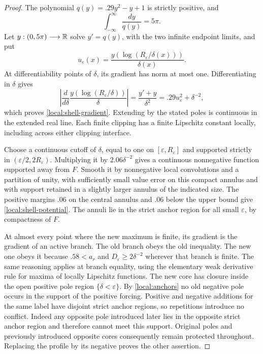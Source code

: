 \begin{proof}
The polynomial
$q(y)=.29y^2-y+1$ is strictly positive, and
\[
 \int_{-\infty}^{\infty}\frac{dy}{q(y)}=5\pi.
\]
Let $y:(0,5\pi)\longrightarrow\mathbb R$ solve $y'=q(y)$, with the two
infinite endpoint limits, and put
\[
 u_\varepsilon(x)=\frac{y(\log(R_\varepsilon/\delta(x)))}{\delta(x)}.
\]
At differentiability points of $\delta$, its gradient has norm at
most one.  Differentiating in $\delta$ gives
\[
 \left|\frac{d}{d\delta}\frac{y(\log(R_\varepsilon/\delta))}{\delta}\right|
   =\frac{y'+y}{\delta^2}
   =.29u_\varepsilon^2+\delta^{-2},
\]
which proves \eqref{local:shell-gradient}.  Extending by the stated
poles is continuous in the extended real line.  Each finite clipping
has a finite Lipschitz constant locally, including across either
clipping interface.

Choose a continuous cutoff of $\delta$, equal to one on
$[\varepsilon,R_\varepsilon]$ and supported strictly in
$(\varepsilon/2,2R_\varepsilon)$.  Multiplying it by
$2.06\delta^{-2}$ gives a continuous nonnegative function supported
away from $F$.  Smooth it by nonnegative local convolutions and a
partition of unity, with sufficiently small value error on this
compact annulus and with support retained in a slightly larger
annulus of the indicated size.  The positive margins $.06$ on the
central annulus and $.06$ below the upper bound give
\eqref{local:shell-potential}.  The annuli lie in the strict anchor
region for all small $\varepsilon$, by compactness of $F$.

At almost every point where the new maximum is finite, its gradient
is the gradient of an active branch.  The old branch obeys the old
inequality.  The new one obeys it because $.58<a_r$ and
$D_\varepsilon\ge2\delta^{-2}$ wherever that branch is finite.
The same reasoning applies at branch equality, using the elementary
weak derivative rule for maxima of locally Lipschitz functions.
The new core has closure inside the open positive pole region
$\{\delta<\varepsilon\}$.  By \cref{local:anchors} no old negative
pole occurs in the support of the positive forcing.  Positive and
negative additions for the same label have disjoint strict anchor
regions, so repetitions introduce no conflict.  Indeed any opposite
pole introduced later lies in the opposite strict anchor region and
therefore cannot meet this support.  Original poles and previously
introduced opposite cores consequently remain protected throughout.
Replacing the profile by its negative proves the other assertion.
\end{proof}

